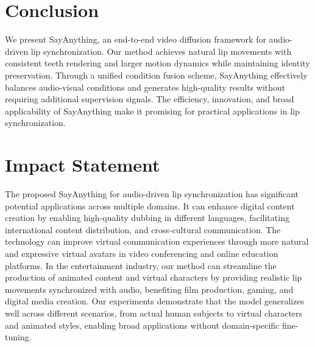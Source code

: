 \section{Conclusion}



We present SayAnything, an end-to-end video diffusion framework for audio-driven lip synchronization. Our method achieves natural lip movements with consistent teeth rendering and larger motion dynamics while maintaining identity preservation. Through a unified condition fusion scheme, SayAnything effectively balances audio-visual conditions and generates high-quality results without requiring additional supervision signals. The efficiency, innovation, and broad applicability of SayAnything make it promising for practical applications in lip synchronization.




\section*{Impact Statement}

The proposed SayAnything for audio-driven lip synchronization has significant potential applications across multiple domains. It can enhance digital content creation by enabling high-quality dubbing in different languages, facilitating international content distribution, and cross-cultural communication. The technology can improve virtual communication experiences through more natural and expressive virtual avatars in video conferencing and online education platforms. In the entertainment industry, our method can streamline the production of animated content and virtual characters by providing realistic lip movements synchronized with audio, benefiting film production, gaming, and digital media creation. Our experiments demonstrate that the model generalizes well across different scenarios, from actual human subjects to virtual characters and animated styles, enabling broad applications without domain-specific fine-tuning.

